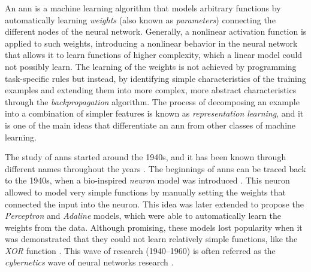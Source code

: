 

An \gls{ann} is a machine learning algorithm that models
arbitrary functions by automatically learning \emph{weights}
(also known as \emph{parameters}) connecting the different
nodes of the neural network. Generally, a nonlinear
activation function is applied to such weights, introducing
a nonlinear behavior in the neural network that allows it to
learn functions of higher complexity, which a linear model
could not possibly learn. The learning of the weights is not
achieved by programming task-specific rules but instead, by
identifying simple characteristics of the training examples
and extending them into more complex, more abstract
characteristics through the \emph{backpropagation}
algorithm. The process of decomposing an example into a
combination of simpler features is known as
\emph{representation learning}, and it is one of the main
ideas that differentiate an \gls{ann} from other classes of
machine learning.

The study of \glspl{ann} started around the 1940s, and it
has been known through different names throughout the years
\parencite{goodfellow2016deep}. The beginnings of
\glspl{ann} can be traced back to the 1940s, when a
bio-inspired \emph{neuron} model was introduced
\parencite{mcculloch1943logical}. This neuron allowed to
model very simple functions by manually setting the weights
that connected the input into the neuron. This idea was
later extended to propose the \emph{Perceptron}
\parencite{rosenblatt1958perceptron} and \emph{Adaline}
\parencite{widrow1960adaptive} models, which were able to
automatically learn the weights from the data. Although
promising, these models lost popularity when it was
demonstrated that they could not learn relatively simple
functions, like the \emph{XOR} function
\parencite{minsky1972perceptrons}. This wave of research
(1940--1960) is often referred as the \emph{cybernetics}
wave of neural networks research
\parencite{goodfellow2016deep}.

